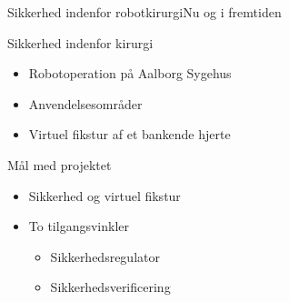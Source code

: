 \begin{frame}{Sikkerhed indenfor robotkirurgi}{Nu og i fremtiden}
\begin{minipage}[b]{0.6\linewidth}
	\vspace{3mm}
\begin{block}{Sikkerhed indenfor kirurgi}
	\begin{itemize}
		\item Robotoperation på Aalborg Sygehus
		\item Anvendelsesområder %
		\item Virtuel fikstur af et bankende hjerte %
	\end{itemize}
\end{block}
\begin{block}{Mål med projektet}
	\begin{itemize}			
			\item Sikkerhed og virtuel fikstur
			\item To tilgangsvinkler
			\begin{itemize}
				\item Sikkerhedsregulator
				\item Sikkerhedsverificering
			\end{itemize}
	\end{itemize}
\end{block}
\end{minipage}
\hspace{0.1cm}

\end{frame}

